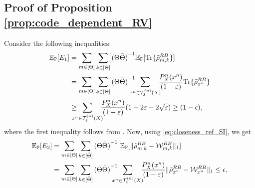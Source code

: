 \subsection{Proof of Proposition \ref{prop:code_dependent_RV}}
\label{app:prop:code_dependent_RV}
Consider the following inequalities:
\begin{align*}
    \EE_\PP[E_1] &= \sum_{m\in [\Theta]}\sum_{k\in [\bTheta]} {(\Theta\bTheta)}^{-1}\EE_\PP[\Tr\{\rhotilde_{m,k}^{\refe B}\}]\\
    & = \sum_{m\in [\Theta]}\sum_{k\in [\bTheta]} {(\Theta\bTheta)}^{-1}\!\!\!\!\!\!\sum_{\xn \in \Txqc}\!\!\!\frac{P^n_X(\xn)}{(1-\varepsilon)}\Tr\{\rhotilde_{\xn}^{\refe B}\}\\
    & \geq \!\!\!\!\!\!\sum_{\xn \in \Txqc}\!\!\!\frac{P^n_X(\xn)}{(1-\varepsilon)}(1-2\varepsilon-2\sqrt{\varepsilon}) \geq (1-\epsilon),
\end{align*}
where the first inequality follows from \cite[Eqn. 23]{wilde_e}. Now, using \eqref{eq:closeness_ref_SI}, we get 
\begin{align*}
    \EE_\PP[E_2] &= \sum_{m\in [\Theta]}\sum_{k\in [\bTheta]}{(\Theta\bTheta)}^{-1}\ \EE_\PP[\|\rhotilde_{m,k}^{\refe B} - \calW^{\refe B}_{m,k}\|_1]\\
    &= \sum_{m\in [\Theta]}\sum_{k\in [\bTheta]} {(\Theta\bTheta)}^{-1}\!\!\!\!\!\!\sum_{\xn \in \Txqc}\!\!\!\frac{P^n_X(\xn)}{(1-\varepsilon)}\|\rhotilde_{\xn}^{\refe B} - \calW^{\refe B}_{\xn}\|_1\leq \epsilon.
\end{align*}
